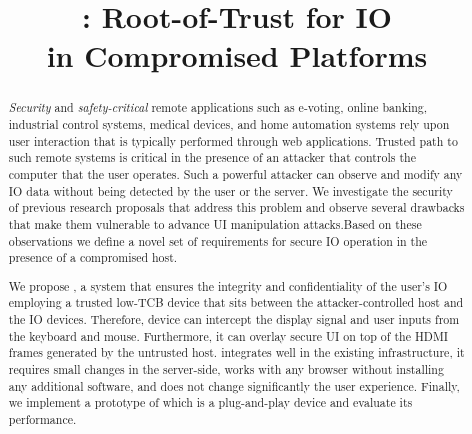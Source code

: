 \newif\ifccs
\ccsfalse

\ifccs

\else

\fi



\newif\ifdesperatetime

\graphicspath{{images/}}


\title{\name: Root-of-Trust for IO \\ in Compromised Platforms}

\ifccs
\else
\maketitle
\fi

\thispagestyle{plain}
\pagestyle{plain}

\begin{abstract}
 

\emph{Security} and \emph{safety-critical} remote applications such as e-voting, online banking, industrial control systems, medical devices, and home automation systems rely upon user interaction that is typically performed through web applications. Trusted path to such remote systems is critical in the presence of an attacker that controls the computer that the user operates. Such a powerful attacker can observe and modify any IO data without being detected by the user or the server. We investigate the security of previous research proposals that address this problem and observe several drawbacks that make them vulnerable to advance UI manipulation attacks.Based on these observations we define a novel set of requirements for secure IO operation in the presence of a compromised host.
  
We propose \name, a system that ensures the integrity and confidentiality of the user's IO employing a trusted low-TCB device that sits between the attacker-controlled host and the IO devices. Therefore, \name device can intercept the display signal and user inputs from the keyboard and mouse. Furthermore, it can overlay secure UI on top of the HDMI frames generated by the untrusted host. \name integrates well in the existing infrastructure, it requires small changes in the server-side, works with any browser without installing any additional software, and does not change significantly the user experience. Finally, we implement a prototype of \name which is a plug-and-play device and evaluate its performance.


\end{abstract}


